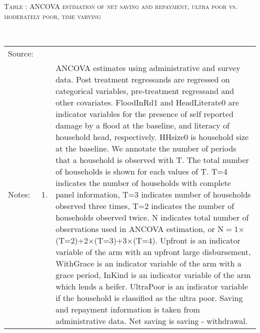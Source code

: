 \hspace{-1cm}\begin{minipage}[t]{14cm}
\hfil\textsc{\normalsize Table \thetable: ANCOVA estimation of net saving and repayment, ultra poor vs. moderately poor, time varying\label{tab ANCOVA Repayment time varying poverty}}\\
\setlength{\tabcolsep}{1pt}
\setlength{\baselineskip}{8pt}
\renewcommand{\arraystretch}{.55}
\hspace{-.75cm}\\
\renewcommand{\arraystretch}{.8}
\setlength{\tabcolsep}{1pt}
\begin{tabular}{>{\hfill\scriptsize}p{1cm}<{}>{\hfill\scriptsize}p{.25cm}<{}>{\scriptsize}p{12cm}<{\hfill}}
Source:& \multicolumn{2}{l}{\scriptsize Estimated with GUK administrative and survey data.}\\
Notes: & 1. & ANCOVA estimates using administrative and survey data. Post treatment regressands are regressed on categorical variables, pre-treatment regressand and other covariates. \textsf{FloodInRd1} and \textsf{HeadLiterate0} are indicator variables for the presence of self reported damage by a flood at the baseline, and literacy of household head, respectively. \textsf{HHsize0} is household size at the baseline. We annotate the number of periods that a household is observed with \textsf{T}. The total number of households is shown for each values of \textsf{T}. \textsf{T=4} indicates the number of households with complete panel information, \textsf{T=3} indicates number of households observed three times, \textsf{T=2} indicates the number of households observed twice. \textsf{N} indicates total number of observations used in ANCOVA estimation, or \textsf{N$=$1$\times$(T=2)+2$\times$(T=3)+3$\times$(T=4)}.  \textsf{Upfront} is an indicator variable of the arm with an upfront large disbursement, \textsf{WithGrace} is an indicator variable of the arm with a grace period, \textsf{InKind} is an indicator variable of the arm which lends a heifer. \textsf{UltraPoor} is an indicator variable if the household is classified as the ultra poor. Saving and repayment information is taken from administrative data. Net saving is saving - withdrawal. %

\end{tabular}
\end{minipage}
